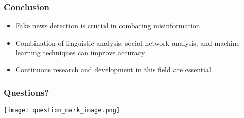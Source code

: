 \documentclass{beamer}
\begin{document}
\begin{frame}
  \frametitle{Conclusion}
  \begin{itemize}
    \item Fake news detection is crucial in combating misinformation
    \item Combination of linguistic analysis, social network analysis, and machine learning techniques can improve accuracy
    \item Continuous research and development in this field are essential
  \end{itemize}
\end{frame}

\begin{frame}
  \frametitle{Questions?}
  \centering
  \texttt{[image: question\_mark\_image.png]}
\end{frame}
\end{document}
